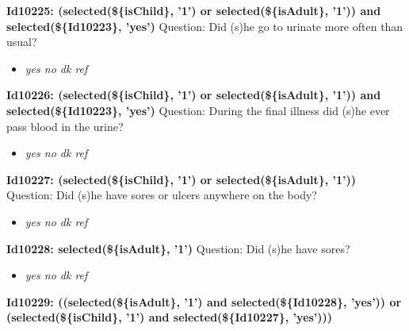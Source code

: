 \documentclass{article}%
\begin{document}
\textbf{Id10225: (selected(\$\{isChild\}, '1') or selected(\$\{isAdult\}, '1')) and selected(\$\{Id10223\}, 'yes')\newline%
}%
Question: Did (s)he go to urinate more often than usual?\newline%
%
\begin{itemize}%
\item%
\textit{yes\newline%
 no\newline%
 dk\newline%
 ref\newline%
}%
\end{itemize}%
\textbf{Id10226: (selected(\$\{isChild\}, '1') or selected(\$\{isAdult\}, '1')) and selected(\$\{Id10223\}, 'yes')\newline%
}%
Question: During the final illness did (s)he ever pass blood in the urine?\newline%
%
\begin{itemize}%
\item%
\textit{yes\newline%
 no\newline%
 dk\newline%
 ref\newline%
}%
\end{itemize}%
\textbf{Id10227: (selected(\$\{isChild\}, '1') or selected(\$\{isAdult\}, '1'))\newline%
}%
Question: Did (s)he have sores or ulcers anywhere on the body?\newline%
%
\begin{itemize}%
\item%
\textit{yes\newline%
 no\newline%
 dk\newline%
 ref\newline%
}%
\end{itemize}%
\textbf{Id10228:  selected(\$\{isAdult\}, '1')\newline%
}%
Question: Did (s)he have sores?\newline%
%
\begin{itemize}%
\item%
\textit{yes\newline%
 no\newline%
 dk\newline%
 ref\newline%
}%
\end{itemize}%
\textbf{Id10229:  ((selected(\$\{isAdult\}, '1') and selected(\$\{Id10228\}, 'yes')) or (selected(\$\{isChild\}, '1') and selected(\$\{Id10227\}, 'yes')))\newline%
}%
\end{document}
